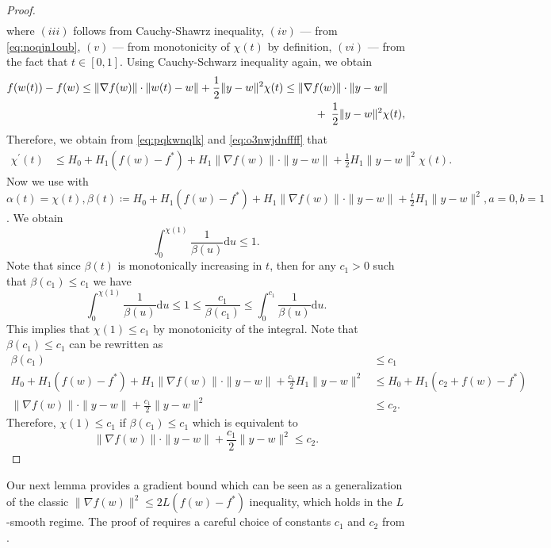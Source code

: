 \documentclass[a4paper,11pt]{article}
\newcommand{\diff}{\mathrm{d}}
\newcommand{\1}{\mathbbm{1}}
\theoremstyle{plain}
\begin{document}
\begin{proof}
\begin{align}
    \end{align}
   where $(iii)$ follows from Cauchy-Shawrz inequality, $(iv)$ --- from \eqref{eq:noqjn1oub}, $(v)$ --- from monotonicity of $\chi(t)$ by definition, $(vi)$ --- from the fact that $t\in[0,1].$ Using Cauchy-Schwarz inequality again, we obtain
    \begin{align}\label{eq:o3nwjdnffff}
        f(w(t)) - f(w) \le \|\nabla f(w)\|\cdot \|w(t)-w\| + \frac{1}{2}\|y-w\|^2\chi(t) &\le \|\nabla f(w)\|\cdot \|y-w\|\notag\\
        &\hspace{1cm}+\; \frac{1}{2}\|y-w\|^2\chi(t),
    \end{align}
    Therefore, we obtain from \eqref{eq:pqkwnqlk} and \eqref{eq:o3nwjdnffff} that
    \begin{align*}
        \chi^\prime(t) &\le H_0 + H_1(f(w) - f^*) + H_1\|\nabla f(w)\|\cdot \|y-w\| + \frac{1}{2}H_1\|y-w\|^2\chi(t).
    \end{align*}
    Now we use  with $\alpha(t)=\chi(t), \beta(t) \coloneqq H_0 + H_1(f(w) - f^*) + H_1\|\nabla f(w)\|\cdot \|y-w\| + \frac{t}{2}H_1\|y-w\|^2, a=0, b=1$. We obtain
    \[
    \int_0^{\chi(1)}\frac{1}{\beta(u)}\diff u \le 1.
    \]
    Note that since $\beta(t)$ is monotonically increasing in $t$, then for any $c_1 > 0$ such that $\beta(c_1) \le c_1$ we have 
    \[
    \int_0^{\chi(1)} \frac{1}{\beta(u)}\diff u \le 1 \le \frac{c_1}{\beta(c_1)} \le \int_0^{c_1} \frac{1}{\beta(u)}\diff u.
    \]
    This implies that $\chi(1) \le c_1$ by monotonicity of the integral. Note that $\beta(c_1) \le c_1$ can be rewritten as 
    \begin{align*}
        \beta(c_1) &\le c_1\\
        H_0 + H_1(f(w) - f^*) + H_1\|\nabla f(w)\|\cdot \|y-w\| + \frac{c_1}{2}H_1\|y-w\|^2 &\le H_0 + H_1(c_2 + f(w) - f^*)\\
        \|\nabla f(w)\|\cdot \|y-w\| + \frac{c_1}{2}\|y-w\|^2 &\le c_2.
    \end{align*}
    Therefore, $\chi(1) \le c_1$ if $\beta(c_1) \le c_1$ which is equivalent to
    \[
    \|\nabla f(w)\|\cdot \|y-w\| + \frac{c_1}{2}\|y-w\|^2 \le c_2.
    \]
    
\end{proof}


Our next lemma provides a gradient bound which can be seen as a generalization of the classic $\|\nabla f(w)\|^2 \le 2L(f(w)-f^*)$ inequality, which holds in the $L$-smooth regime. The proof of  requires a careful choice of constants $c_1$ and $c_2$ from .
\end{document}

